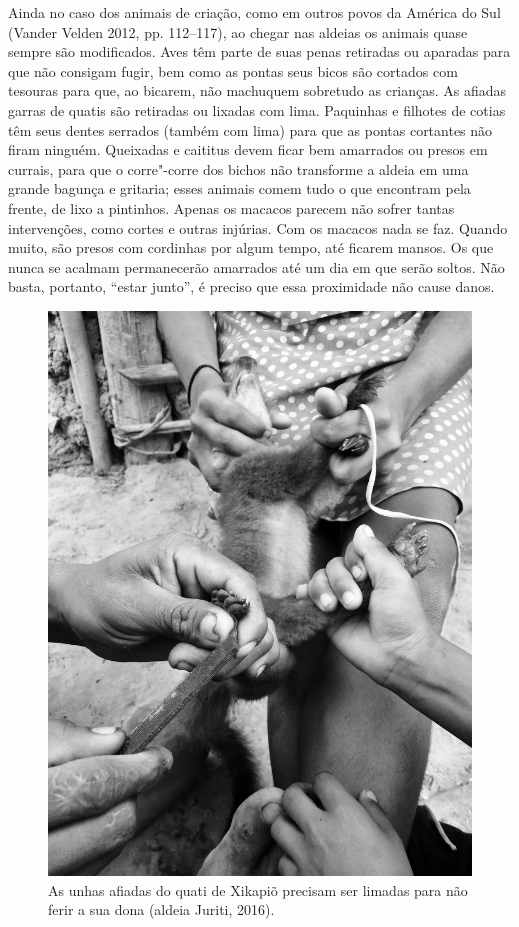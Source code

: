 Ainda no caso dos animais de criação, como em outros povos da América do
Sul (Vander Velden 2012, pp. 112--117), ao chegar nas aldeias os animais
quase sempre são modificados. Aves têm parte de suas penas retiradas ou
aparadas para que não consigam fugir, bem como as pontas seus bicos são
cortados com tesouras para que, ao bicarem, não machuquem sobretudo as
crianças. As afiadas garras de quatis são retiradas ou lixadas com lima.
Paquinhas e filhotes de cotias têm seus dentes serrados (também com
lima) para que as pontas cortantes não firam ninguém. Queixadas e
caititus devem ficar bem amarrados ou presos em currais, para que o
corre"-corre dos bichos não transforme a aldeia em uma grande bagunça e
gritaria; esses animais comem tudo o que encontram pela frente, de lixo
a pintinhos. Apenas os macacos parecem não sofrer tantas intervenções,
como cortes e outras injúrias. Com os macacos nada se faz. Quando muito,
são presos com cordinhas por algum tempo, até ficarem mansos. Os que
nunca se acalmam permanecerão amarrados até um dia em que serão soltos.
Não basta, portanto, ``estar junto'', é preciso que essa proximidade não
cause danos.

\begin{figure}[H]
\centering
  \includegraphics[width=\textwidth]{./imgs/IMG_0343}
\caption{As unhas afiadas do quati de Xikapiõ precisam ser limadas para não ferir a
sua dona (aldeia Juriti, 2016).}
\end{figure}

